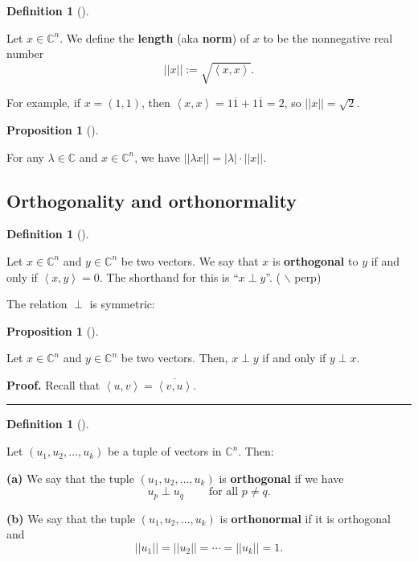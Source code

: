 \documentclass[numbers=enddot,12pt,final,onecolumn,notitlepage]{scrartcl}%
\numberwithin{exer}{subsection}
\theoremstyle{definition}
\newtheorem{prop}[theo]{Proposition}
\newenvironment{proposition}[1][]
{\begin{prop}[#1]\begin{leftbar}}
{\end{leftbar}\end{prop}}
\newtheorem{defi}[theo]{Definition}
\newenvironment{definition}[1][]
{\begin{defi}[#1]\begin{leftbar}}
{\end{leftbar}\end{defi}}
\newenvironment{proof}[1][Proof]{\noindent\textbf{#1.} }{\ \rule{0.5em}{0.5em}}
\begin{document}
\begin{definition}
Let $x\in\mathbb{C}^{n}$. We define the \textbf{length} (aka \textbf{norm}) of
$x$ to be the nonnegative real number%
\[
\left\vert \left\vert x\right\vert \right\vert :=\sqrt{\left\langle
x,x\right\rangle }.
\]

\end{definition}

For example, if $x=\left(  1,1\right)  $, then $\left\langle x,x\right\rangle
=1\overline{1}+1\overline{1}=2$, so $\left\vert \left\vert x\right\vert
\right\vert =\sqrt{2}$.

\begin{proposition}
For any $\lambda\in\mathbb{C}$ and $x\in\mathbb{C}^{n}$, we have $\left\vert
\left\vert \lambda x\right\vert \right\vert =\left\vert \lambda\right\vert
\cdot\left\vert \left\vert x\right\vert \right\vert $.
\end{proposition}

\subsection{Orthogonality and orthonormality}

\begin{definition}
Let $x\in\mathbb{C}^{n}$ and $y\in\mathbb{C}^{n}$ be two vectors. We say that
$x$ is \textbf{orthogonal} to $y$ if and only if $\left\langle
x,y\right\rangle =0$. The shorthand for this is \textquotedblleft$x\perp
y$\textquotedblright. (%
$\backslash$%
perp)
\end{definition}

The relation $\perp$ is symmetric:

\begin{proposition}
Let $x\in\mathbb{C}^{n}$ and $y\in\mathbb{C}^{n}$ be two vectors. Then,
$x\perp y$ if and only if $y\perp x$.
\end{proposition}

\begin{proof}
Recall that $\left\langle u,v\right\rangle =\overline{\left\langle
v,u\right\rangle }$.
\end{proof}

\begin{definition}
Let $\left(  u_{1},u_{2},\ldots,u_{k}\right)  $ be a tuple of vectors in
$\mathbb{C}^{n}$. Then:

\textbf{(a)} We say that the tuple $\left(  u_{1},u_{2},\ldots,u_{k}\right)  $
is \textbf{orthogonal} if we have%
\[
u_{p}\perp u_{q}\ \ \ \ \ \ \ \ \ \ \text{for all }p\neq q.
\]


\textbf{(b)} We say that the tuple $\left(  u_{1},u_{2},\ldots,u_{k}\right)  $
is \textbf{orthonormal} if it is orthogonal and%
\[
\left\vert \left\vert u_{1}\right\vert \right\vert =\left\vert \left\vert
u_{2}\right\vert \right\vert =\cdots=\left\vert \left\vert u_{k}\right\vert
\right\vert =1.
\]

\end{definition}
\end{document}
